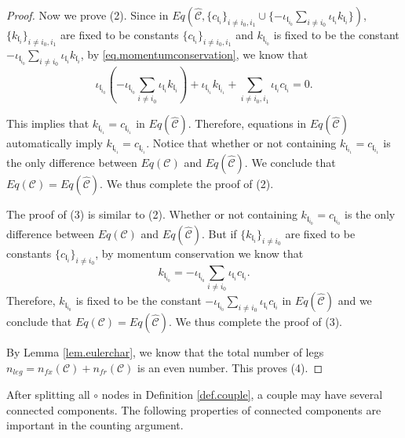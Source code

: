 \begin{proof}
Now we prove (2). Since in $Eq\left(\widehat{\mathcal{C}}, \{c_{\mathfrak{l}_{i}}\}_{i\ne i_0, i_1}\cup \{-\iota_{\mathfrak{l}_{i_0}}\sum_{i\ne i_0} \iota_{\mathfrak{l}_i}k_{\mathfrak{l}_i}\}\right)$, $\{k_{\mathfrak{l}_{i}}\}_{i\ne i_0, i_1}$ are fixed to be constants $\{c_{\mathfrak{l}_{i}}\}_{i\ne i_0, i_1}$ and $k_{\mathfrak{l}_{i_0}}$ is fixed to be the constant $-\iota_{\mathfrak{l}_{i_0}}\sum_{i\ne i_0} \iota_{\mathfrak{l}_i}k_{\mathfrak{l}_i}$, by \eqref{eq.momentumconservation}, we know that 
\begin{equation}
    \iota_{\mathfrak{l}_{i_0}}\left(-\iota_{\mathfrak{l}_{i_0}}\sum_{i\ne i_0} \iota_{\mathfrak{l}_i}k_{\mathfrak{l}_i}\right)+ \iota_{\mathfrak{l}_{i_1}}k_{\mathfrak{l}_{i_1}}+\sum_{i\ne i_0, i_1} \iota_{\mathfrak{l}_i}c_{\mathfrak{l}_i}=0.
\end{equation}

This implies that $k_{\mathfrak{l}_{i_1}}=c_{\mathfrak{l}_{i_1}}$ in $Eq(\widehat{\mathcal{C}})$. Therefore, equations in $Eq(\widehat{\mathcal{C}})$ automatically imply $k_{\mathfrak{l}_{i_1}}=c_{\mathfrak{l}_{i_1}}$. Notice that whether or not containing $k_{\mathfrak{l}_{i_1}}=c_{\mathfrak{l}_{i_1}}$ is the only difference between $Eq(\mathcal{C})$ and $Eq(\widehat{\mathcal{C}})$. We conclude that $Eq(\mathcal{C})=Eq(\widehat{\mathcal{C}})$. We thus complete the proof of (2).

The proof of (3) is similar to (2). Whether or not containing $k_{\mathfrak{l}_{i_0}}=c_{\mathfrak{l}_{i_0}}$ is the only difference between $Eq(\mathcal{C})$ and $Eq(\widehat{\mathcal{C}})$. But if $\{k_{\mathfrak{l}_{i}}\}_{i\ne i_0}$ are fixed to be constants $\{c_{\mathfrak{l}_{i}}\}_{i\ne i_0}$, by momentum conservation we know that 
\begin{equation}
        k_{\mathfrak{l}_{i_0}}=-\iota_{\mathfrak{l}_{i_0}}\sum_{i\ne i_0} \iota_{\mathfrak{l}_i}c_{\mathfrak{l}_i}.
\end{equation}
Therefore, $k_{\mathfrak{l}_{i_0}}$ is fixed to be the constant $-\iota_{\mathfrak{l}_{i_0}}\sum_{i\ne i_0} \iota_{\mathfrak{l}_i}c_{\mathfrak{l}_i}$ in $Eq(\widehat{\mathcal{C}})$ and we conclude that $Eq(\mathcal{C})=Eq(\widehat{\mathcal{C}})$. We thus complete the proof of (3).

By Lemma \ref{lem.eulerchar}, we know that the total number of legs $n_{leg} = n_{fx}(\mathcal{C})+n_{\textit{fr}}(\mathcal{C})$ is an even number. This proves (4).
\end{proof}

After splitting all $\circ$ nodes in Definition \ref{def.couple}, a couple may have several connected components. The following properties of connected components are important in the counting argument.

